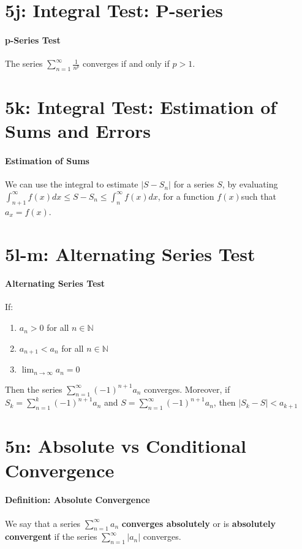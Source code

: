 \documentclass[10pt,letter]{article}
\begin{document}
\section*{5j: Integral Test: P-series}
\paragraph{p-Series Test}
The series $\sum_{n=1}^\infty \frac{1}{n^p}$ converges if and only if $p>1$. 


\section*{5k: Integral Test: Estimation of Sums and Errors}
\paragraph{Estimation of Sums}
We can use the integral to estimate $|S-S_n|$ for a series $S$, by evaluating $\int_{n+1}^\infty f(x)dx\leq S-S_n\leq \int_n^\infty f(x)dx$, for a function $f(x)$such that $a_x=f(x)$. 


\section*{5l-m: Alternating Series Test}
\paragraph{Alternating Series Test}
If: \begin{enumerate}
    \item $a_n>0$ for all $n\in\mathbb{N}$ 
    \item $a_{n+1}<a_n$ for all $n\in\mathbb{N}$ 
    \item $\lim_{n\rightarrow\infty} a_n=0$
\end{enumerate}
Then the series $\sum_{n=1}^\infty(-1)^{n+1}a_n$ converges. Moreover, if $S_k=\sum_{n=1}^k(-1)^{n+1}a_n$ and $S=\sum_{n=1}^\infty(-1)^{n+1}a_n$, then $|S_k-S|< a_{k+1}$

\section*{5n: Absolute vs Conditional Convergence}
\paragraph{Definition: Absolute Convergence}
We say that a series $\sum_{n=1}^\infty a_n$ \textbf{converges absolutely} or is \textbf{absolutely convergent} if the series $\sum_{n=1}^\infty |a_n|$ converges.
\end{document}
